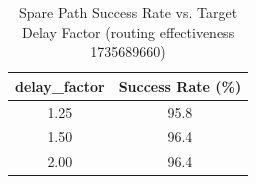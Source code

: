 \begin{table}[htbp]
\centering
\caption{Spare Path Success Rate vs. Target Delay Factor (routing effectiveness 1735689660)}
\label{tab:success_rate_routing_effectiveness_1735689660}
\begin{tabular}{cc}
\toprule
delay_factor & Success Rate (\%) \\
\midrule
1.25 & 95.8 \\
1.50 & 96.4 \\
2.00 & 96.4 \\
\bottomrule
\end{tabular}
\end{table}
